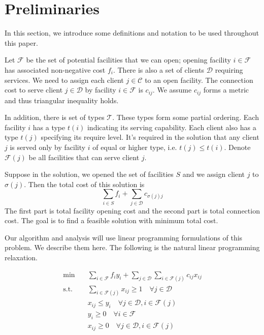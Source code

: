 \section{Preliminaries}

In this section, we introduce some definitions and notation to be used throughout this paper.

Let $\mathcal{F}$ be the set of potential facilities that we can open; opening facility $i \in \mathcal{F}$ has associated non-negative cost $f_i$.
There is also a set of clients $\mathcal{D}$ requiring services. We need to assign each client $j \in \mathcal{C}$ to an open facility.
The connection cost to serve client $j\in \mathcal{D}$ by facility $i \in \mathcal{F}$ is $c_{ij}$.
We assume $c_{ij}$ forms a metric and thus triangular inequality holds.

In addition, there is set of types $\mathcal{T}$. These types form some partial ordering. Each facility $i$ has a type $t(i)$ indicating its serving capability. Each client also has a type $t(j)$ specifying its require level. It's required in the solution that any client $j$ is served only by facility $i$ of equal or higher type, i.e. $t(j) \le t(i)$. Denote $\mathcal{F}(j)$ be all facilities that can serve client $j$.

Suppose in the solution, we opened the set of facilities $S$ and we assign client $j$ to $\sigma(j)$. Then the total cost of this solution is
\[  \sum_{i \in S} f_i + \sum_{j \in \mathcal{D}} c_{\sigma(j)j}    \]
The first part is total facility opening cost and the second part is total connection cost. The goal is to find a feasible solution with minimum total cost.

Our algorithm and analysis will use linear programming formulations of this problem. We describe them here. The following is the natural linear programming relaxation.

\begin{align}
\min \quad & \sum_{i \in \mathcal{F}} f_i y_i + \sum_{j \in \mathcal{D}} \sum_{i \in \mathcal{F}(j)} c_{ij}x_{ij} \label{LP:main} \\
\text{s.t.} \quad & \sum_{i \in \mathcal{F}(j)} x_{ij} \ge 1 \quad \forall {j \in \mathcal{D}} \label{con:P:demand}\\
& x_{ij} \le y_i    \quad \forall j \in \mathcal{D}, i \in \mathcal{F}(j)   \label{con:P:reliance}\\
& y_i \ge 0 \quad \forall {i \in \mathcal{F}}   \label{con:P:ynonneg}\\
& x_{ij} \ge 0 \quad \forall j \in \mathcal{D}, i \in \mathcal{F}(j) \label{con:P:xnonneg}
\end{align}

